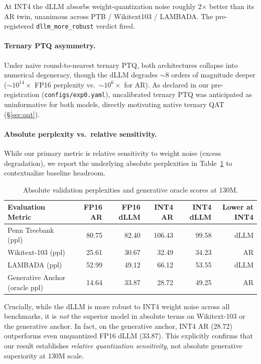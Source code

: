 \documentclass[11pt]{article}
\begin{document}
At INT4 the dLLM absorbs weight-quantization noise roughly 2$\times$ better than its AR twin, unanimous across PTB / Wikitext103 / LAMBADA. The pre-registered \texttt{dllm\_more\_robust} verdict fired. 

\paragraph{Ternary PTQ asymmetry.} Under naive round-to-nearest ternary PTQ, both architectures collapse into numerical degeneracy, though the dLLM degrades $\sim 8$ orders of magnitude deeper ($\sim 10^{14}\times$ FP16 perplexity vs.\ $\sim 10^6\times$ for AR). As declared in our pre-registration (\texttt{configs/exp0.yaml}), uncalibrated ternary PTQ was anticipated as uninformative for both models, directly motivating native ternary QAT (\S\ref{sec:qat}).

\paragraph{Absolute perplexity vs.\ relative sensitivity.} While our primary metric is relative sensitivity to weight noise (excess degradation), we report the underlying absolute perplexities in Table~\ref{tab:absolute_ptq} to contextualize baseline headroom.

\begin{table}[h]
\centering
\small
\caption{Absolute validation perplexities and generative oracle scores at 130M.}
\label{tab:absolute_ptq}
\vspace{2mm}
\begin{tabular}{lrrrrr}
\toprule
Evaluation Metric & FP16 AR & FP16 dLLM & INT4 AR & INT4 dLLM & Lower at INT4 \\
\midrule
Penn Treebank (ppl) & 80.75 & 82.40 & 106.43 & 99.58 & dLLM \\
Wikitext-103 (ppl) & 25.61 & 30.67 & 32.49 & 34.23 & AR \\
LAMBADA (ppl) & 52.99 & 49.12 & 66.12 & 53.55 & dLLM \\
Generative Anchor (oracle ppl) & 14.64 & 33.87 & 28.72 & 49.25 & AR \\
\bottomrule
\end{tabular}
\end{table}

Crucially, while the dLLM is more robust to INT4 weight noise across all benchmarks, it is \emph{not} the superior model in absolute terms on Wikitext-103 or the generative anchor. In fact, on the generative anchor, INT4 AR (28.72) outperforms even unquantized FP16 dLLM (33.87). This explicitly confirms that our result establishes \emph{relative quantization sensitivity}, not absolute generative superiority at 130M scale.
\end{document}
